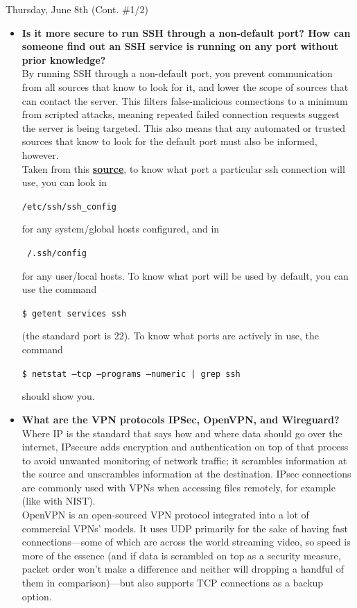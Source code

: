 \documentclass[11pt]{article}
\newcommand\codebox[1]{
    \noindent\hspace{-0.25em}\begin{tcolorbox}[on line, hbox, colback = codeblack, colframe = codeborder, coltext = white, boxrule = 1.5pt, left = 2pt, right = 2pt, top = 0.5pt, bottom = 0.5pt]
    \small\texttt{#1}\normalsize
    \end{tcolorbox}\hspace{-0.25em}
}
\begin{document}
\begin{orangebox}{Thursday, June 8th (Cont. \#1/2)\vspace{-2.2em}\begin{flushright}\end{flushright}}
\begin{itemize}
    \item\textbf{Is it more secure to run SSH through a non-default port? How can someone find out an SSH service is running on any port without prior knowledge?} \\
    \phantom{~~~~} By running SSH through a non-default port, you prevent communication from all sources that know to look for it, and lower the scope of sources that can contact the server. This filters false-malicious connections to a minimum from scripted attacks, meaning repeated failed connection requests suggest the server is being targeted. This also means that any automated or trusted sources that know to look for the default port must also be informed, however. \\
    \phantom{~~~~} Taken from this \href{https://unix.stackexchange.com/questions/539882/find-which-port-does-ssh-client-used-to-send-connection-request}{\textbf{source}}, to know what port a particular ssh connection will use, you can look in \codebox{/etc/ssh/ssh\_config} for any system/global hosts configured, and in \codebox{~/.ssh/config} for any user/local hosts. To know what port will be used by default, you can use the command \codebox{\$ getent services ssh} (the standard port is 22). To know what ports are actively in use, the command \codebox{\$ netstat --tcp --programs --numeric | grep ssh} should show you.
    \item\textbf{What are the VPN protocols IPSec, OpenVPN, and Wireguard?} \\
    \phantom{~~~~} Where IP is the standard that says how and where data should go over the internet, IPsecure adds encryption and authentication on top of that process to avoid unwanted monitoring of network traffic; it scrambles information at the source and unscrambles information at the destination. IPsec connections are commonly used with VPNs when accessing files remotely, for example (like with NIST). \\
    \phantom{~~~~} OpenVPN is an open-sourced VPN protocol integrated into a lot of commercial VPNs' models. It uses UDP primarily for the sake of having fast connections---some of which are across the world streaming video, so speed is more of the essence (and if data is scrambled on top as a security measure, packet order won't make a difference and neither will dropping a handful of them in comparison)---but also supports TCP connections as a backup option. \\

\end{itemize}
\end{orangebox}
\end{document}
